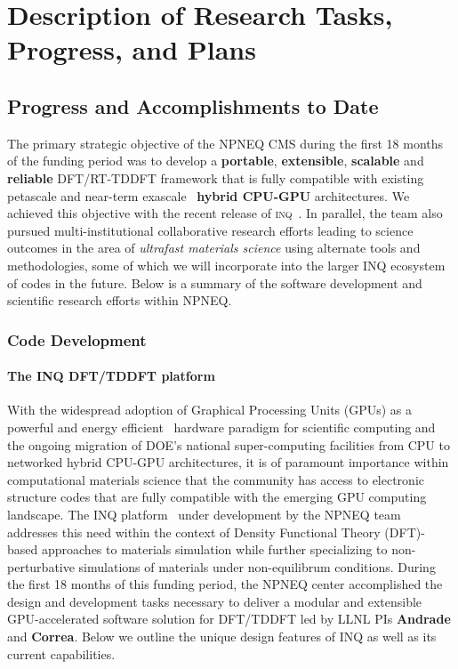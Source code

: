 \section{Description of Research Tasks, Progress, and Plans}
\label{sec:research}


\subsection{Progress and Accomplishments to Date}

The primary strategic objective of the NPNEQ CMS during the first 18 months of the funding period was to develop a \textbf{portable}, \textbf{extensible}, \textbf{scalable} and \textbf{reliable} DFT/RT-TDDFT framework that is fully compatible with existing petascale and near-term exascale~\cite{Kothe2019} \textbf{hybrid CPU-GPU} architectures.
We achieved this objective with the recent release of \textsc{inq}~\cite{Andrade2021}. 
In parallel, the team also pursued multi-institutional collaborative research efforts leading to science outcomes in the area of \emph{ultrafast materials science} using alternate tools and methodologies, some of which we will incorporate into the larger INQ ecosystem of codes in the future. 
Below is a summary of the software development and scientific research efforts within NPNEQ.

\subsubsection{Code Development}
\label{subsubsec:Code}
\paragraph{The INQ DFT/TDDFT platform}


With the widespread adoption of Graphical Processing Units (GPUs) as a powerful and energy efficient~\cite{Huang2009} hardware paradigm for scientific computing and the ongoing migration of DOE's national super-computing facilities from CPU to networked hybrid CPU-GPU architectures, it is of paramount importance within computational materials science that the community has access to electronic structure codes that are fully compatible with the emerging GPU computing landscape.
The INQ platform~\cite{Andrade2021} under development by the NPNEQ team addresses this need within the context of Density Functional Theory (DFT)-based approaches to materials simulation while further specializing to non-perturbative simulations of materials under non-equilibrum conditions.
During the first 18 months of this funding period, the NPNEQ center accomplished the design and development tasks necessary to deliver a modular and extensible GPU-accelerated software solution for DFT/TDDFT led by LLNL PIs \textbf{Andrade} and \textbf{Correa}.
Below we outline the unique design features of INQ as well as its current capabilities.

